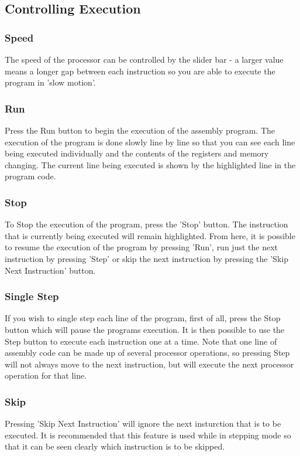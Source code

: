 \documentclass[12pt]{report}
\begin{document}
\subsection{Controlling Execution}
\subsubsection{Speed}
The speed of the processor can be controlled by the slider bar - a larger value means a longer gap between each instruction so you are able to execute the program in 'slow motion'.  

\subsubsection{Run}
Press the Run button to begin the execution of the assembly program.  The execution of the program is done slowly line by line so that you can see each line being executed individually and the contents of the registers and memory changing.  The current line being executed is shown by the highlighted line in the program code.

\subsubsection{Stop}
To Stop the execution of the program, press the 'Stop' button.  The instruction that is currently being executed will remain highlighted.  From here, it is possible to resume the execution of the program by pressing 'Run', run just the next instruction by pressing 'Step' or skip the next instruction by pressing the 'Skip Next Instruction' button.

\subsubsection{Single Step}
If you wish to single step each line of the program, first of all, press the Stop button which will pause the programs execution.  It is then possible to use the Step button to execute each instruction one at a time.  Note that one line of assembly code can be made up of several processor operations, so pressing Step will not always move to the next instruction, but will execute the next processor operation for that line.

\subsubsection{Skip}
Pressing 'Skip Next Instruction' will ignore the next insturction that is to be executed.  It is recommended that this feature is used while in stepping mode so that it can be seen clearly which instruction is to be skipped.
\end{document}

